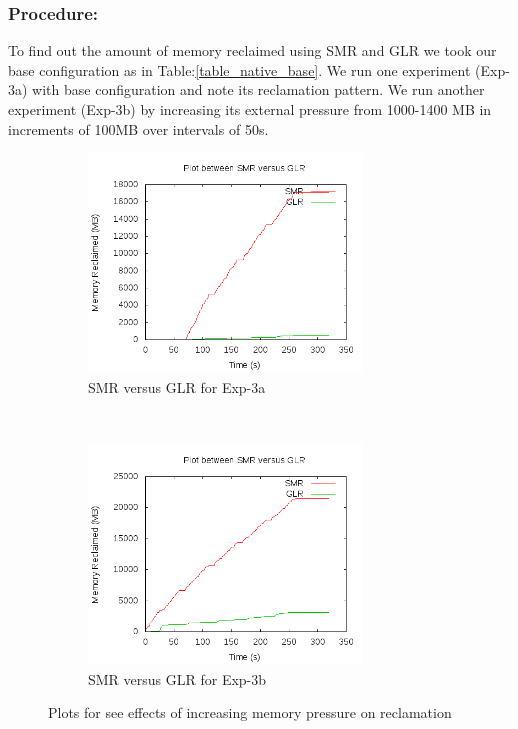 	\subsubsection{Procedure:}
	  To find out the amount of memory reclaimed using SMR and GLR we took our base configuration as in Table:\ref{table_native_base}. 
We run one experiment (Exp-3a) with base configuration and note its reclamation pattern. We run another experiment (Exp-3b) by increasing 
its external pressure from 1000-1400 MB in increments of 100MB over intervals of 50s.
	 
	\begin{figure}[t!]
	  \centering
	  \begin{subfigure}[t]{0.48\textwidth}
	    \centering
	    \includegraphics[width=0.8\textwidth]{images/experimentation/smr_glr/1/compare.png}
	    \caption{SMR versus GLR for Exp-3a}
	    \label{img_smr_glr_1_compare}
	  \end{subfigure}
	  ~ 
	  \begin{subfigure}[t]{0.48\textwidth}
	    \centering
	    \includegraphics[width=0.8\textwidth]{images/experimentation/smr_glr/2/compare.png}
	    \caption{SMR versus GLR for Exp-3b}
	    \label{img_smr_glr_2_compare}
	  \end{subfigure}
	  \caption{Plots for see effects of increasing memory pressure on reclamation}
	\end{figure}	
	  
